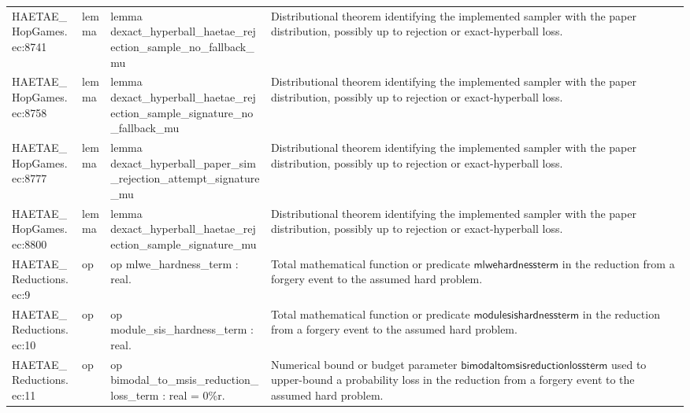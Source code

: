 \documentclass[10pt]{article}
\begin{document}
\begin{longtable}{L{0.11\textwidth}L{0.055\textwidth}L{0.385\textwidth}L{0.41\textwidth}}
HAETAE\_\allowbreak{}HopGames.\allowbreak{}ec:\allowbreak{}8741 & lemma & {\ttfamily\scriptsize lemma dexact\_\allowbreak{}hyperball\_\allowbreak{}haetae\_\allowbreak{}rejection\_\allowbreak{}sample\_\allowbreak{}no\_\allowbreak{}fallback\_\allowbreak{}mu} & Distributional theorem identifying the implemented sampler with the paper distribution, possibly up to rejection or exact-hyperball loss. \\
HAETAE\_\allowbreak{}HopGames.\allowbreak{}ec:\allowbreak{}8758 & lemma & {\ttfamily\scriptsize lemma dexact\_\allowbreak{}hyperball\_\allowbreak{}haetae\_\allowbreak{}rejection\_\allowbreak{}sample\_\allowbreak{}signature\_\allowbreak{}no\_\allowbreak{}fallback\_\allowbreak{}mu} & Distributional theorem identifying the implemented sampler with the paper distribution, possibly up to rejection or exact-hyperball loss. \\
HAETAE\_\allowbreak{}HopGames.\allowbreak{}ec:\allowbreak{}8777 & lemma & {\ttfamily\scriptsize lemma dexact\_\allowbreak{}hyperball\_\allowbreak{}paper\_\allowbreak{}sim\_\allowbreak{}rejection\_\allowbreak{}attempt\_\allowbreak{}signature\_\allowbreak{}mu} & Distributional theorem identifying the implemented sampler with the paper distribution, possibly up to rejection or exact-hyperball loss. \\
HAETAE\_\allowbreak{}HopGames.\allowbreak{}ec:\allowbreak{}8800 & lemma & {\ttfamily\scriptsize lemma dexact\_\allowbreak{}hyperball\_\allowbreak{}haetae\_\allowbreak{}rejection\_\allowbreak{}sample\_\allowbreak{}signature\_\allowbreak{}mu} & Distributional theorem identifying the implemented sampler with the paper distribution, possibly up to rejection or exact-hyperball loss. \\
HAETAE\_\allowbreak{}Reductions.\allowbreak{}ec:\allowbreak{}9 & op & {\ttfamily\scriptsize op mlwe\_\allowbreak{}hardness\_\allowbreak{}term : real.} & Total mathematical function or predicate $\mathsf{mlwehardnessterm}$ in the reduction from a forgery event to the assumed hard problem. \\
HAETAE\_\allowbreak{}Reductions.\allowbreak{}ec:\allowbreak{}10 & op & {\ttfamily\scriptsize op module\_\allowbreak{}sis\_\allowbreak{}hardness\_\allowbreak{}term : real.} & Total mathematical function or predicate $\mathsf{modulesishardnessterm}$ in the reduction from a forgery event to the assumed hard problem. \\
HAETAE\_\allowbreak{}Reductions.\allowbreak{}ec:\allowbreak{}11 & op & {\ttfamily\scriptsize op bimodal\_\allowbreak{}to\_\allowbreak{}msis\_\allowbreak{}reduction\_\allowbreak{}loss\_\allowbreak{}term : real = 0\%r.} & Numerical bound or budget parameter $\mathsf{bimodaltomsisreductionlossterm}$ used to upper-bound a probability loss in the reduction from a forgery event to the assumed hard problem. \\

\end{longtable}
\end{document}
